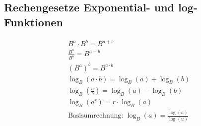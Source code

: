 \subsection{Rechengesetze Exponential- und log-Funktionen}
    \begin{align*}
        B^a \cdot B^b = B^{a + b}\\
        \frac{B^a}{B^b} = B^{a - b}\\
        (B^a)^b = B^{a \cdot b}\\
        \log_B (a \cdot b ) = \log_B (a) + \log_B (b)\\
        \log_B \left( \frac{a}{b} \right) = \log_B (a) - \log_B (b)\\
        \log_B (a^r) = r \cdot \log_B (a)\\
        \textrm{Basisumrechnung: } \log_B (a) = \frac{\log(a)}{\log(u)}
    \end{align*}